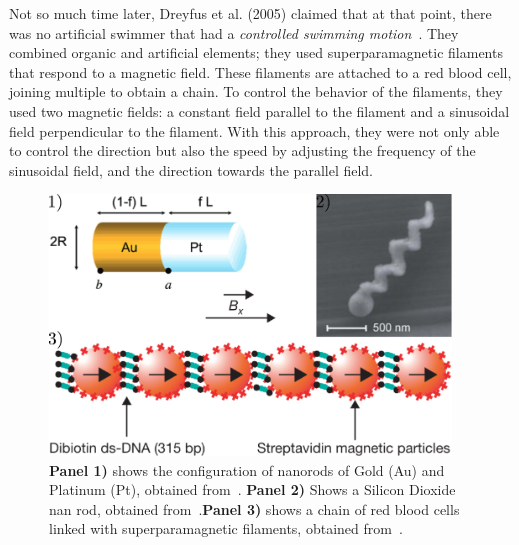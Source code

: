 Not so much time later, Dreyfus et al. (2005) claimed that at that point, there was no artificial swimmer that had a \textit{controlled swimming motion}~\cite{dreyfus2005microscopic}. They combined organic and artificial elements; they used superparamagnetic filaments that respond to a magnetic field. These filaments are attached to a red blood cell, joining multiple to obtain a chain. To control the behavior of the filaments, they used two magnetic fields: a constant field parallel to the filament and a sinusoidal field perpendicular to the filament. With this approach, they were not only able to control the direction but also the speed by adjusting the frequency of the sinusoidal field, and the direction towards the parallel field.

\begin{figure}
  \begin{center}
    \includegraphics[width=0.95\textwidth]{figures/artificialExamples.pdf}
  \end{center}
  \caption[Artificail microswimmers]{\textbf{Panel 1)} shows the configuration of nanorods of Gold (Au) and Platinum (Pt), obtained from~\cite{paxton2004catalytic}. \textbf{Panel 2)} Shows a Silicon Dioxide nan rod, obtained from~\cite{ghosh2009controlled}.\textbf{Panel 3)} shows a chain of red blood cells linked with superparamagnetic filaments, obtained from~\cite{dreyfus2005microscopic}.}\label{fig:artificialexamples}
\end{figure}


